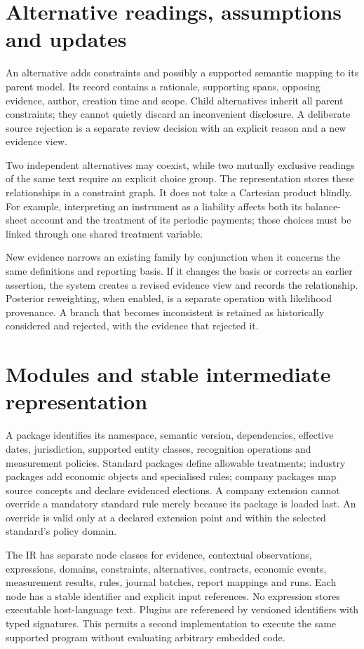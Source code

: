 \section{Alternative readings, assumptions and updates}

An alternative adds constraints and possibly a supported semantic mapping to
its parent model. Its record contains a rationale, supporting spans, opposing
evidence, author, creation time and scope. Child alternatives inherit all
parent constraints; they cannot quietly discard an inconvenient disclosure.
A deliberate source rejection is a separate review decision with an explicit
reason and a new evidence view.

Two independent alternatives may coexist, while two mutually exclusive readings
of the same text require an explicit choice group. The representation stores
these relationships in a constraint graph. It does not take a Cartesian
product blindly. For example, interpreting an instrument as a liability affects
both its balance-sheet account and the treatment of its periodic payments;
those choices must be linked through one shared treatment variable.

New evidence narrows an existing family by conjunction when it concerns the
same definitions and reporting basis. If it changes the basis or corrects an
earlier assertion, the system creates a revised evidence view and records the
relationship. Posterior reweighting, when enabled, is a separate operation
with likelihood provenance. A branch that becomes inconsistent is retained
as historically considered and rejected, with the evidence that rejected it.

\section{Modules and stable intermediate representation}

A package identifies its namespace, semantic version, dependencies, effective
dates, jurisdiction, supported entity classes, recognition operations and
measurement policies. Standard packages define allowable treatments; industry
packages add economic objects and specialised rules; company packages map
source concepts and declare evidenced elections. A company extension cannot
override a mandatory standard rule merely because its package is loaded last.
An override is valid only at a declared extension point and within the selected
standard's policy domain.

The IR has separate node classes for evidence, contextual observations,
expressions, domains, constraints, alternatives, contracts, economic events,
measurement results, rules, journal batches, report mappings and runs.
Each node has a stable identifier and explicit input references. No expression
stores executable host-language text. Plugins are referenced by versioned
identifiers with typed signatures. This permits a second implementation to
execute the same supported program without evaluating arbitrary embedded code.


